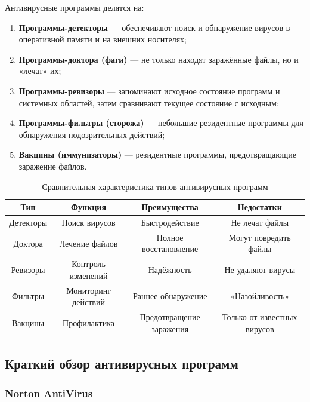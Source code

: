 Антивирусные программы делятся на:
 
\begin{enumerate}
    \item \textbf{Программы-детекторы} — обеспечивают поиск и обнаружение вирусов в оперативной памяти и на внешних носителях;
    \item \textbf{Программы-доктора (фаги)} — не только находят заражённые файлы, но и «лечат» их;
    \item \textbf{Программы-ревизоры} — запоминают исходное состояние программ и системных областей, затем сравнивают текущее состояние с исходным;
    \item \textbf{Программы-фильтры (сторожа)} — небольшие резидентные программы для обнаружения подозрительных действий;
    \item \textbf{Вакцины (иммунизаторы)} — резидентные программы, предотвращающие заражение файлов.
\end{enumerate}
 
\begin{table}[h]
    \centering
    \caption{Сравнительная характеристика типов антивирусных программ}
    \label{tab:antivirus_types}
    \begin{tabular}{|c|c|c|c|}
        \hline
        \textbf{Тип} & \textbf{Функция} & \textbf{Преимущества} & \textbf{Недостатки} \\
        \hline
        Детекторы & Поиск вирусов & Быстродействие & Не лечат файлы \\
        Доктора & Лечение файлов & Полное восстановление & Могут повредить файлы \\
        Ревизоры & Контроль изменений & Надёжность & Не удаляют вирусы \\
        Фильтры & Мониторинг действий & Раннее обнаружение & «Назойливость» \\
        Вакцины & Профилактика & Предотвращение заражения & Только от известных вирусов \\
        \hline
    \end{tabular}
\end{table}
 
\subsection{Краткий обзор антивирусных программ}
 
\subsubsection{Norton AntiVirus}
 
